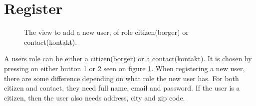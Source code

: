 \section{Register}\label{sec:controlPanelRegistering}
\begin{figure}[H]
    \centering
    \hfill
    \hfill
    \hfill
    \caption{The view to add a new user, of role citizen(borger) or contact(kontakt).}
    \label{fig:controlPanelRegisterViewr}
\end{figure}

A users role can be either a citizen(borger) or a contact(kontakt). It is chosen by pressing on either button 1 or 2 seen on figure \ref{fig:controlPanelRegisterViewr}. When registering a new user, there are some difference depending on what role the new user has. For both citizen and contact, they need full name, email and password. If the user is a citizen, then the user also needs address, city and zip code.

